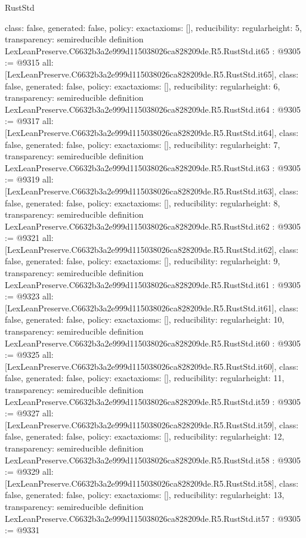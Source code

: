 \begin{lexlean}{RustStd}
\begin{coremodule}
{  class: false,
  generated: false,
  policy: exact{axioms: []},
  reducibility: regular{height: 5},
  transparency: semireducible
}
definition LexLeanPreserve.C6632b3a2e999d115038026ca828209de.R5.RustStd.it65 : @9305 := @9315 {
  all: [LexLeanPreserve.C6632b3a2e999d115038026ca828209de.R5.RustStd.it65],
  class: false,
  generated: false,
  policy: exact{axioms: []},
  reducibility: regular{height: 6},
  transparency: semireducible
}
definition LexLeanPreserve.C6632b3a2e999d115038026ca828209de.R5.RustStd.it64 : @9305 := @9317 {
  all: [LexLeanPreserve.C6632b3a2e999d115038026ca828209de.R5.RustStd.it64],
  class: false,
  generated: false,
  policy: exact{axioms: []},
  reducibility: regular{height: 7},
  transparency: semireducible
}
definition LexLeanPreserve.C6632b3a2e999d115038026ca828209de.R5.RustStd.it63 : @9305 := @9319 {
  all: [LexLeanPreserve.C6632b3a2e999d115038026ca828209de.R5.RustStd.it63],
  class: false,
  generated: false,
  policy: exact{axioms: []},
  reducibility: regular{height: 8},
  transparency: semireducible
}
definition LexLeanPreserve.C6632b3a2e999d115038026ca828209de.R5.RustStd.it62 : @9305 := @9321 {
  all: [LexLeanPreserve.C6632b3a2e999d115038026ca828209de.R5.RustStd.it62],
  class: false,
  generated: false,
  policy: exact{axioms: []},
  reducibility: regular{height: 9},
  transparency: semireducible
}
definition LexLeanPreserve.C6632b3a2e999d115038026ca828209de.R5.RustStd.it61 : @9305 := @9323 {
  all: [LexLeanPreserve.C6632b3a2e999d115038026ca828209de.R5.RustStd.it61],
  class: false,
  generated: false,
  policy: exact{axioms: []},
  reducibility: regular{height: 10},
  transparency: semireducible
}
definition LexLeanPreserve.C6632b3a2e999d115038026ca828209de.R5.RustStd.it60 : @9305 := @9325 {
  all: [LexLeanPreserve.C6632b3a2e999d115038026ca828209de.R5.RustStd.it60],
  class: false,
  generated: false,
  policy: exact{axioms: []},
  reducibility: regular{height: 11},
  transparency: semireducible
}
definition LexLeanPreserve.C6632b3a2e999d115038026ca828209de.R5.RustStd.it59 : @9305 := @9327 {
  all: [LexLeanPreserve.C6632b3a2e999d115038026ca828209de.R5.RustStd.it59],
  class: false,
  generated: false,
  policy: exact{axioms: []},
  reducibility: regular{height: 12},
  transparency: semireducible
}
definition LexLeanPreserve.C6632b3a2e999d115038026ca828209de.R5.RustStd.it58 : @9305 := @9329 {
  all: [LexLeanPreserve.C6632b3a2e999d115038026ca828209de.R5.RustStd.it58],
  class: false,
  generated: false,
  policy: exact{axioms: []},
  reducibility: regular{height: 13},
  transparency: semireducible
}
definition LexLeanPreserve.C6632b3a2e999d115038026ca828209de.R5.RustStd.it57 : @9305 := @9331 {
}
\end{coremodule}
\end{lexlean}
